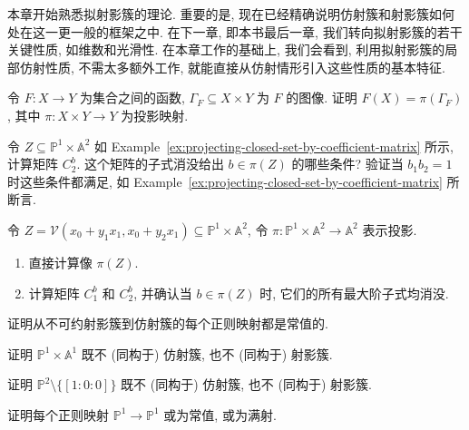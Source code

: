 本章开始熟悉拟射影簇的理论. 重要的是, 现在已经精确说明仿射簇和射影簇如何处在这一更一般的框架之中. 在下一章, 即本书最后一章, 我们转向拟射影簇的若干关键性质, 如维数和光滑性. 在本章工作的基础上, 我们会看到, 利用拟射影簇的局部仿射性质, 不需太多额外工作, 就能直接从仿射情形引入这些性质的基本特征.

\BookExerciseHeading
\begin{BookExercises}
  \item\label{ex:image-of-map-is-projection-of-graph} 令 $F:X\to Y$ 为集合之间的函数, $\Gamma_{F}\subseteq X\times Y$ 为 $F$ 的图像. 证明 $F(X)=\pi(\Gamma_{F})$, 其中 $\pi:X\times Y\to Y$ 为投影映射.
  \item\label{ex:coefficient-matrix-for-quadratic-multiples-in-projection-example} 令 $Z\subseteq\mathbb{P}^{1}\times\mathbb{A}^{2}$ 如 Example~\ref{ex:projecting-closed-set-by-coefficient-matrix} 所示, 计算矩阵 $C_{2}^{b}$. 这个矩阵的子式消没给出 $b\in\pi(Z)$ 的哪些条件? 验证当 $b_{1}b_{2}=1$ 时这些条件都满足, 如 Example~\ref{ex:projecting-closed-set-by-coefficient-matrix} 所断言.
  \item\label{ex:projection-of-common-root-of-two-linear-forms} 令 $Z=\mathcal{V}(x_{0}+y_{1}x_{1},x_{0}+y_{2}x_{1})\subseteq\mathbb{P}^{1}\times\mathbb{A}^{2}$, 令 $\pi:\mathbb{P}^{1}\times\mathbb{A}^{2}\to\mathbb{A}^{2}$ 表示投影.
  \begin{enumerate}
    \item 直接计算像 $\pi(Z)$.
    \item 计算矩阵 $C_{1}^{b}$ 和 $C_{2}^{b}$, 并确认当 $b\in\pi(Z)$ 时, 它们的所有最大阶子式均消没.
  \end{enumerate}
  \item\label{ex:regular-map-from-projective-to-affine-is-constant} 证明从不可约射影簇到仿射簇的每个正则映射都是常值的.
  \item\label{ex:projective-line-times-affine-line-is-neither-affine-nor-projective} 证明 $\mathbb{P}^{1}\times\mathbb{A}^{1}$ 既不 (同构于) 仿射簇, 也不 (同构于) 射影簇.
  \item\label{ex:punctured-projective-plane-is-neither-affine-nor-projective} 证明 $\mathbb{P}^{2}\setminus\{[1:0:0]\}$ 既不 (同构于) 仿射簇, 也不 (同构于) 射影簇.
  \item\label{ex:projective-line-endomorphism-constant-or-surjective} 证明每个正则映射 $\mathbb{P}^{1}\to\mathbb{P}^{1}$ 或为常值, 或为满射.
\end{BookExercises}
